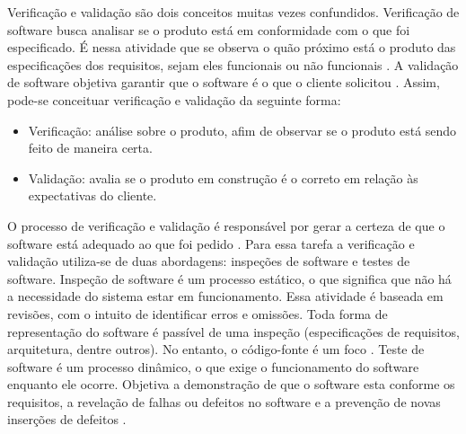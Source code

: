 \par
\indent Verificação e validação são dois conceitos muitas vezes confundidos. Verificação de software busca analisar se o produto está em conformidade com o que foi especificado. É nessa atividade que se observa o quão próximo está o produto das especificações dos requisitos, sejam eles funcionais ou não funcionais \cite{sommerville2007}. A validação de software objetiva garantir que o software é o que o cliente solicitou \cite{sommerville2007}. Assim, pode-se conceituar verificação e validação da seguinte forma:
\begin{itemize}
\item Verificação: análise sobre o produto, afim de observar se o produto está sendo feito de maneira certa.
\item Validação: avalia se o produto em construção é o correto em relação às expectativas do cliente.
\end{itemize}
\par
\indent O processo de verificação e validação é responsável por gerar a certeza de que o software está adequado ao que foi pedido \cite{sommerville2007}. Para essa tarefa a verificação e validação utiliza-se de duas abordagens: inspeções de software e testes de software. Inspeção de software é um processo estático, o que significa que não há a necessidade do sistema estar em funcionamento. Essa atividade é baseada em revisões, com o intuito de identificar erros e omissões. Toda forma de representação do software é passível de uma inspeção (especificações de requisitos, arquitetura, dentre outros). No entanto, o código-fonte é um foco \cite{sommerville2007}. Teste de software é um processo dinâmico, o que exige o funcionamento do software enquanto ele ocorre. Objetiva a demonstração de que o software esta conforme os requisitos, a revelação de falhas ou defeitos no software \cite{sommerville2007} e a prevenção de novas inserções de defeitos \cite{burkeCoyner2003}.

